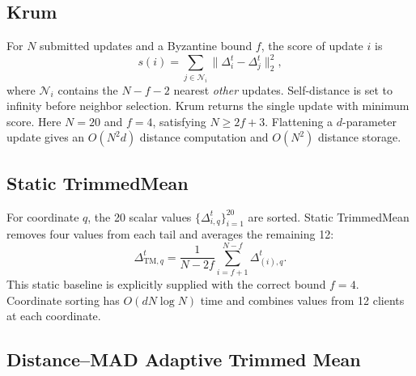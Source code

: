 \documentclass[10pt,letterpaper]{article}
\begin{document}
\subsection{Krum}

For $N$ submitted updates and a Byzantine bound $f$, the score of update $i$ is
\begin{equation}
s(i)=\sum_{j\in\mathcal{N}_i}\|\Delta_i^t-\Delta_j^t\|_2^2,
\end{equation}
where $\mathcal{N}_i$ contains the $N-f-2$ nearest \emph{other} updates.
Self-distance is set to infinity before neighbor selection. Krum returns the
single update with minimum score. Here $N=20$ and $f=4$, satisfying
$N\geq2f+3$. Flattening a $d$-parameter update gives an
$O(N^2d)$ distance computation and $O(N^2)$ distance storage.

\subsection{Static TrimmedMean}

For coordinate $q$, the 20 scalar values
$\{\Delta_{i,q}^t\}_{i=1}^{20}$ are sorted. Static TrimmedMean removes four
values from each tail and averages the remaining 12:
\begin{equation}
\Delta_{\mathrm{TM},q}^t=
\frac{1}{N-2f}\sum_{i=f+1}^{N-f}\Delta_{(i),q}^t.
\end{equation}
This static baseline is explicitly supplied with the correct bound $f=4$.
Coordinate sorting has $O(dN\log N)$ time and combines values from 12 clients
at each coordinate.

\subsection{Distance--MAD Adaptive Trimmed Mean}
\end{document}
